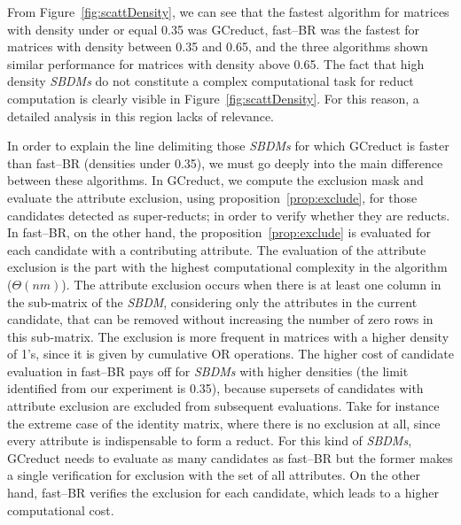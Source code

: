 \documentclass[authoryear,preprint,review,12pt]{elsarticle}
\begin{document}
	From Figure~\ref{fig:scattDensity}, we can see that the fastest algorithm for matrices with density under or equal 0.35 was GCreduct, fast--BR was the fastest for matrices with density between 0.35 and 0.65, and the three algorithms shown similar performance for matrices with density above 0.65. The fact that high density \textit{SBDMs} do not constitute a complex computational task for reduct computation \citep{Rojas12} is clearly visible in Figure~\ref{fig:scattDensity}. For this reason, a detailed analysis in this region lacks of relevance.
		
	In order to explain the line delimiting those \textit{SBDMs} for which GCreduct is faster than fast--BR (densities under 0.35), we must go deeply into the main difference between these algorithms. In GCreduct, we compute the exclusion mask and evaluate the attribute exclusion, using proposition~\ref{prop:exclude}, for those candidates detected as super-reducts; in order to verify whether they are reducts. In fast--BR, on the other hand, the proposition~\ref{prop:exclude} is evaluated for each candidate with a contributing attribute. The evaluation of the attribute exclusion is the part with the highest computational complexity in the algorithm ($\Theta (nm)$). The attribute exclusion occurs when there is at least one column in the sub-matrix of the \textit{SBDM}, considering only the attributes in the current candidate, that can be removed without increasing the number of zero rows in this sub-matrix. The exclusion is more frequent in matrices with a higher density of 1's, since it is given by cumulative OR operations. The higher cost of candidate evaluation in fast--BR pays off for \textit{SBDMs} with higher densities (the limit identified from our experiment is 0.35), because supersets of candidates with attribute exclusion are excluded from subsequent evaluations. Take for instance the extreme case of the identity matrix, where there is no exclusion at all, since every attribute is indispensable to form a reduct. For this kind of \textit{SBDMs}, GCreduct needs to evaluate as many candidates as fast--BR but the former makes a single verification for exclusion with the set of all attributes. On the other hand, fast--BR verifies the exclusion for each candidate, which leads to a higher computational cost.
	
\end{document}
